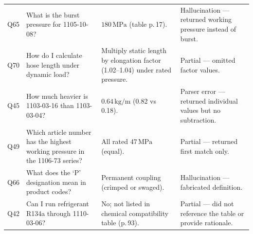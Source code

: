 \begin{table}[htbp]
\begin{tabularx}{\textwidth}{p{} p{} p{} p{}}
        \addlinespace
        
        Q65 &
        What is the burst pressure for 1105-10-08? &
        $180\,\text{MPa}$ (table p.\,17). &
        Hallucination — returned working pressure instead of burst. \\
        
        \addlinespace
        
        Q70 &
        How do I calculate hose length under dynamic load? &
        Multiply static length by elongation factor (1.02–1.04) under rated pressure. &
        Partial — omitted factor values. \\
        
        \addlinespace
        
        Q45 &
        How much heavier is 1103-03-16 than 1103-03-04? &
        $0.64\,\text{kg/m}$ (0.82 vs 0.18). &
        Parser error — returned individual values but no subtraction. \\
        
        \addlinespace
        
        Q49 &
        Which article number has the highest working pressure in the 1106-73 series? &
        All rated $47\,\text{MPa}$ (equal). &
        Partial — returned first match only. \\
        
        \addlinespace
        
        Q66 &
        What does the `P' designation mean in product codes? &
        Permanent coupling (crimped or swaged). &
        Hallucination — fabricated definition. \\
        
        \addlinespace
        
        Q42 &
        Can I run refrigerant R134a through 1110-03-06? &
        No; not listed in chemical compatibility table (p.\,93). &
        Partial — did not reference the table or provide rationale. \\
        
        \bottomrule
    \end{tabularx}
\end{table}

\vspace{0.5em}

